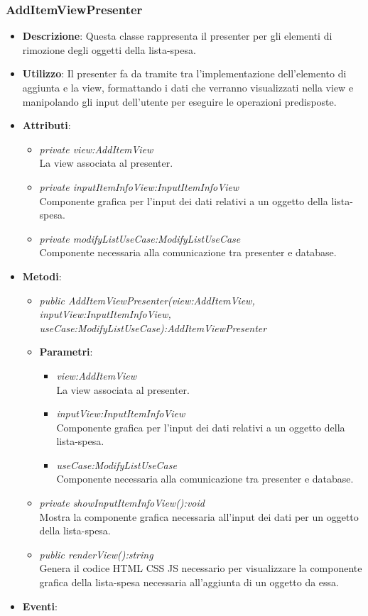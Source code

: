 \subsubsection{AddItemViewPresenter}
\begin{itemize}
\item \textbf{Descrizione}: Questa classe rappresenta il presenter per gli elementi di rimozione degli oggetti  della lista-spesa.
\item \textbf{Utilizzo}: Il presenter fa da tramite tra l'implementazione dell'elemento di aggiunta e la view, formattando i dati che verranno visualizzati nella view e manipolando gli input dell'utente per eseguire le operazioni predisposte.
\item \textbf{Attributi}: 
	\begin{itemize}
	\item \textit{private view:AddItemView}\\
	La view associata al presenter.
	\item \textit{private inputItemInfoView:InputItemInfoView}\\
	Componente grafica per l'input dei dati relativi a un oggetto della lista-spesa.
	\item \textit{private modifyListUseCase:ModifyListUseCase}\\
	Componente necessaria alla comunicazione tra presenter e database.
	\end{itemize}
\item \textbf{Metodi}:
	\begin{itemize}
	\item \textit{public AddItemViewPresenter(view:AddItemView, inputView:InputItemInfoView, useCase:ModifyListUseCase):AddItemViewPresenter}	
		\item{\textbf{Parametri}: \begin{itemize}
		\item \textit{view:AddItemView}\\
			La view associata al presenter.
		\item \textit{inputView:InputItemInfoView}\\
			Componente grafica per l'input dei dati relativi a un oggetto della lista-spesa.
		\item \textit{useCase:ModifyListUseCase}\\
			Componente necessaria alla comunicazione tra presenter e database.
		\end{itemize}}
	\item \textit{private showInputItemInfoView():void}\\
	Mostra la componente grafica necessaria all'input dei dati per un oggetto della lista-spesa.
	\item \textit{public renderView():string}\\
	Genera il codice HTML CSS JS necessario per visualizzare la componente grafica della lista-spesa necessaria all'aggiunta di un oggetto da essa.
	\end{itemize}
\item \textbf{Eventi}:
\end{itemize}

